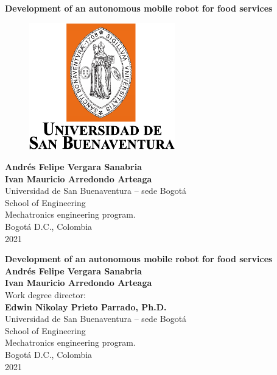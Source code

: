 \cleardoublepage

\thispagestyle{empty} 
\begin{center}
\textbf{ 
\huge{Development of an autonomous mobile robot for food services}}\\[1.0cm]


\begin{figure}[htbp]
	\centering
		\includegraphics[height=5.5cm,keepaspectratio]{OtrosTex/LogoUSB}
\end{figure}

\vspace*{2.5cm} 
\Large\textbf{Andrés Felipe Vergara Sanabria \\ Ivan Mauricio Arredondo Arteaga}\\[1.0cm]

\vspace*{2cm} 
\Large{Universidad de San Buenaventura \--- sede Bogotá}\\
\Large{School of Engineering}\\
\Large{Mechatronics engineering program.}\\
\large{Bogotá D.C., Colombia\\
2021}\\
\end{center}

\newpage{\pagestyle{empty}\cleardoublepage}
\newpage

\begin{center}
\thispagestyle{empty} \vspace*{0cm} \textbf{\huge
Development of an autonomous mobile robot for food services}\\[2cm]
\vspace*{1cm}
\Large\textbf{Andrés Felipe Vergara Sanabria \\ Ivan Mauricio Arredondo Arteaga}\\[2.5cm]
\large{Work degree director:}\\%
\large\textbf{Edwin Nikolay Prieto Parrado, Ph.D.}\\[1.5cm]



\vspace*{2.5cm}
\Large{Universidad de San Buenaventura \--- sede Bogotá}\\
\Large{School of Engineering}\\
\Large{Mechatronics engineering program.}\\
\large{Bogotá D.C., Colombia\\
2021}\\
\end{center}


%
